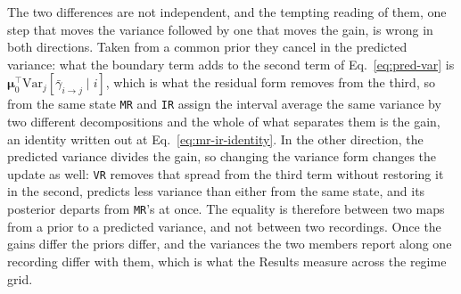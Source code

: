 \begin{appendixbox}
The two differences are not independent, and the tempting reading of them, one step that
moves the variance followed by one that moves the gain, is wrong in both directions. Taken
from a common prior they cancel in the predicted variance: what the boundary term adds to
the second term of Eq.~\ref{eq:pred-var} is
$\bm{\mu}_0^\top\mathrm{Var}_{j}[\bar{\gamma}_{i\to j}\mid i]$, which is what
the residual form removes from the third, so from the same state \texttt{MR} and \texttt{IR}
assign the interval average the same variance by two different decompositions and the whole
of what separates them is the gain, an identity written out at
Eq.~\ref{eq:mr-ir-identity}. In the other direction, the predicted
variance divides the gain, so changing the variance form changes the update as well:
\texttt{VR} removes that spread from the third term without restoring it in the second,
predicts less variance than either from the same state, and its posterior departs from
\texttt{MR}'s at once. The equality is therefore between two maps from a prior to a
predicted variance, and not between two recordings. Once the gains differ the priors differ,
and the variances the two members report along one recording differ with them, which is what
the Results measure across the regime grid.


\end{appendixbox}
